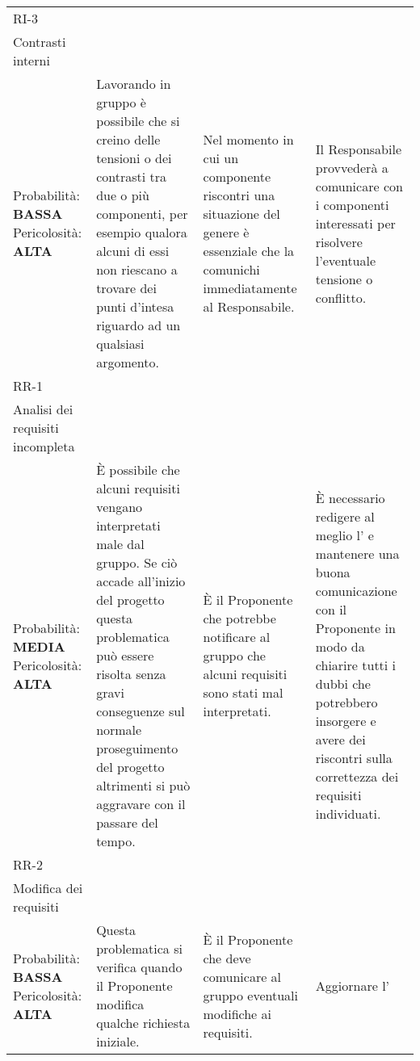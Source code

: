 \begin{longtable}{
		>{\centering}p{}
		>{\centering}p{}
		>{\centering}p{}
		>{\centering\arraybackslash}p{} }
	\rowcolor{lightRowColor}
	RI-3 \\ Contrasti interni \\
		\vspace{5mm} %
		Probabilità: \textbf{BASSA} Pericolosità: \textbf{ALTA} &
		Lavorando in gruppo è possibile che si creino delle tensioni o dei contrasti tra due o più componenti, per esempio qualora alcuni di essi non riescano a trovare dei punti d'intesa riguardo ad un qualsiasi argomento.
		&
		Nel momento in cui un componente riscontri una situazione del genere è essenziale che la comunichi immediatamente al Responsabile.
		&
		Il Responsabile provvederà a comunicare con i componenti interessati per risolvere l'eventuale tensione o conflitto. \\

	\rowcolor{darkRowColor}
	RR-1 \\ Analisi dei requisiti incompleta \\
		\vspace{5mm} %
		Probabilità: \textbf{MEDIA} Pericolosità: \textbf{ALTA} &
		È possibile che alcuni requisiti vengano interpretati male dal gruppo. Se ciò accade all'inizio del progetto questa problematica può essere risolta senza gravi conseguenze sul normale proseguimento del progetto altrimenti si può aggravare con il passare del tempo.
		&
		È il Proponente\ped{\textit{G}} che potrebbe notificare al gruppo che alcuni requisiti sono stati mal interpretati.
		&
		È necessario redigere al meglio l'\textit{\AdR} e mantenere una buona comunicazione con il Proponente\ped{\textit{G}} in modo da chiarire tutti i dubbi che potrebbero insorgere e avere dei riscontri sulla correttezza dei requisiti individuati. \\

	\rowcolor{lightRowColor}
		RR-2 \\ Modifica dei requisiti \\
		\vspace{5mm} %
		Probabilità: \textbf{BASSA} Pericolosità: \textbf{ALTA} &
		Questa problematica si verifica quando il Proponente\ped{\textit{G}} modifica qualche richiesta iniziale.
		&
		È il Proponente\ped{\textit{G}} che deve comunicare al gruppo eventuali modifiche ai requisiti.
		&
		Aggiornare l'\textit{\AdR} \\
\end{longtable}

